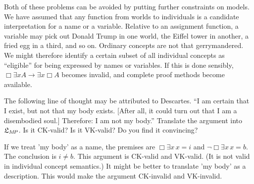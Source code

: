 Both of these problems can be avoided by putting further constraints on models.
We have assumed that any function from worlds to individuals is a candidate
interpretation for a name or a variable. Relative to an assignment function, a
variable may pick out Donald Trump in one world, the Eiffel tower in another, a
fried egg in a third, and so on. Ordinary concepts are not that gerrymandered.
We might therefore identify a certain subset of all individual concepts as
``eligible'' for being expressed by names or variables. If this is done
sensibly, $\Box \exists x A \to \exists x \Box A$ becomes invalid, and complete
proof methods become available.



\begin{exercise}
  The following line of thought may be attributed to Descartes. ``I am certain
  that I exist, but not that my body exists. [After all, it could turn out that
  I am a disembodied soul.] Therefore: I am not my body.'' Translate the
  argument into $\mathfrak{L}_{M\!P}$. Is it CK-valid? Is it VK-valid? Do you find it
  convincing?
\end{exercise}
\begin{solution}
  If we treat 'my body' as a name, the premises are $\Box \exists x\, x\!=\!i$ and
  $\neg\Box \exists x\, x\!=\!b$. The conclusion is $i\!\not=\!b$. This argument
  is CK-valid and VK-valid. (It is not valid in individual concept semantics.)
  It might be better to translate 'my body' as a description. This would make the argument CK-invalid and VK-invalid. 
\end{solution}


